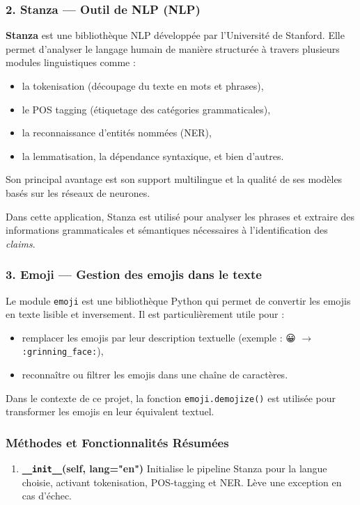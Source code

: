 \begin{description}
\begin{description}
\begin{description}
\begin{itemize}
\subsubsection*{\textbullet{} 2. Stanza --- Outil de NLP (NLP)}
\textbf{Stanza} est une bibliothèque NLP développée par l'Université de Stanford. Elle permet d'analyser le langage humain de manière structurée à travers plusieurs modules linguistiques comme :
\begin{itemize}
    \item la tokenisation (découpage du texte en mots et phrases),
    \item le POS tagging (étiquetage des catégories grammaticales),
    \item la reconnaissance d'entités nommées (NER),
    \item la lemmatisation, la dépendance syntaxique, et bien d'autres.
\end{itemize}
Son principal avantage est son support multilingue et la qualité de ses modèles basés sur les réseaux de neurones.

Dans cette application, Stanza est utilisé pour analyser les phrases et extraire des informations grammaticales et sémantiques nécessaires à l'identification des \textit{claims}.

\subsubsection*{\textbullet{} 3. Emoji --- Gestion des emojis dans le texte}
Le module \texttt{emoji} est une bibliothèque Python qui permet de convertir les emojis en texte lisible et inversement. Il est particulièrement utile pour :
\begin{itemize}
    \item remplacer les emojis par leur description textuelle (exemple : 😀 $\rightarrow$ \texttt{:grinning\_face:}),
    \item reconnaître ou filtrer les emojis dans une chaîne de caractères.
\end{itemize}
Dans le contexte de ce projet, la fonction \texttt{emoji.demojize()} est utilisée pour transformer les emojis en leur équivalent textuel.


\subsubsection*{\textbullet{} Méthodes et Fonctionnalités Résumées}

\begin{enumerate}
    \item \textbf{\texttt{\_\_init\_\_}(self, lang="en")}  
    Initialise le pipeline Stanza pour la langue choisie, activant tokenisation, POS-tagging et NER. Lève une exception en cas d’échec.


\end{enumerate}
\end{itemize}
\end{description}
\end{description}
\end{description}
